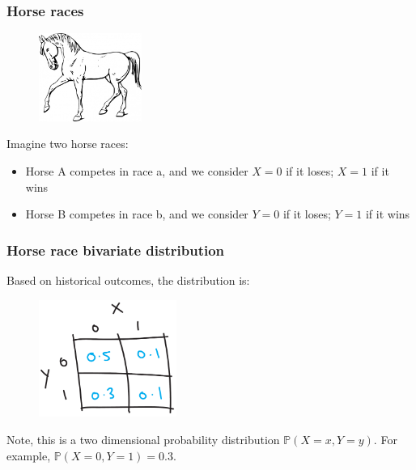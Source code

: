 \documentclass{beamer}
\begin{document}
	\begin{frame}
		\frametitle{Horse races}
		
		\begin{figure}[ht]
			\centerline{\includegraphics[width=0.3\textwidth]{./figures/horse.jpeg}}
		\end{figure}
		
		Imagine two horse races:
		
		\begin{itemize}
			\item Horse A competes in race a, and we consider $X=0$ if it loses; $X=1$ if it wins
			\item Horse B competes in race b, and we consider $Y=0$ if it loses; $Y=1$ if it wins
		\end{itemize}
		
	\end{frame}
	
	\begin{frame}
		\frametitle{Horse race bivariate distribution}
		
		Based on historical outcomes, the distribution is:
		
		\begin{figure}[ht]
			\centerline{\includegraphics[width=0.4\textwidth]{./figures/horse_race_base.pdf}}
		\end{figure}
		
		Note, this is a two dimensional probability distribution $\mathbb{P}(X=x, Y=y)$. For example, $\mathbb{P}(X=0, Y=1)=0.3$.
		
	\end{frame}
	
\end{document}
